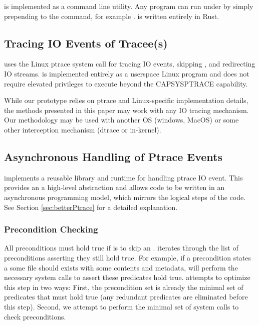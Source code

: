 \pc is implemented as a command line utility. Any program can run under \pc by simply prepending \pc to the command, for example . \pc is written entirely in Rust. %

\subsection{Tracing IO Events of Tracee(s)}
\pc uses the Linux ptrace system call for tracing IO events, skipping \cacheunit, and redirecting IO streams. \pc is implemented entirely as a userspace Linux program and does not require elevated privileges to execute beyond the CAP\textunderscore SYS\textunderscore PTRACE capability.

While our prototype relies on ptrace and Linux-specific implementation details, the methods presented in this paper may work with any IO tracing mechanism. Our methodology may be used with another OS (windows, MacOS) or some other interception mechanism (dtrace or in-kernel).

\subsection{Asynchronous Handling of Ptrace Events}
\pc implements a reusable library and runtime for handling ptrace IO event. This provides an a high-level abstraction and allows code to be written in an asynchronous programming model, which mirrors the logical steps of the code. See Section \ref{sec:betterPtrace} for a detailed explanation.

\subsubsection{Precondition Checking}
\label{sec:precondition-checking}
All preconditions must hold true if \pc is to skip an \cacheunit{}. \pc iterates through the list of preconditions asserting they still hold true. For example, if a precondition states a some file  should exists with some contents and metadata, \pc will perform the necessary system calls to assert these predicates hold true. \pc attempts to optimize this step in two ways: First, the precondition set is already the minimal set of predicates that must hold true (any redundant predicates are eliminated before this step). Second, we attempt to perform the minimal set of system calls to check preconditions.

